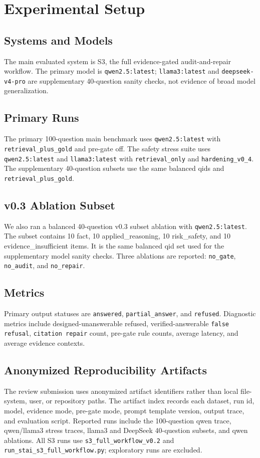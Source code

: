 \section{Experimental Setup}

\subsection{Systems and Models}

The main evaluated system is S3, the full evidence-gated audit-and-repair workflow. The primary model is \texttt{qwen2.5:latest}; \texttt{llama3:latest} and \texttt{deepseek-v4-pro} are supplementary 40-question sanity checks, not evidence of broad model generalization.

\subsection{Primary Runs}

The primary 100-question main benchmark uses \texttt{qwen2.5:latest} with \texttt{retrieval\_plus\_gold} and pre-gate off. The safety stress suite uses \texttt{qwen2.5:latest} and \texttt{llama3:latest} with \texttt{retrieval\_only} and \texttt{hardening\_v0\_4}. The supplementary 40-question subsets use the same balanced qids and \texttt{retrieval\_plus\_gold}.

\subsection{v0.3 Ablation Subset}

We also ran a balanced 40-question v0.3 subset ablation with \texttt{qwen2.5:latest}. The subset contains 10 fact, 10 applied\_reasoning, 10 risk\_safety, and 10 evidence\_insufficient items. It is the same balanced qid set used for the supplementary model sanity checks. Three ablations are reported: \texttt{no\_gate}, \texttt{no\_audit}, and \texttt{no\_repair}.

\subsection{Metrics}

Primary output statuses are \texttt{answered}, \texttt{partial\_answer}, and \texttt{refused}. Diagnostic metrics include designed-unanswerable refused, verified-answerable \texttt{false refusal}, \texttt{citation repair} count, pre-gate rule counts, average latency, and average evidence contexts.

\subsection{Anonymized Reproducibility Artifacts}

The review submission uses anonymized artifact identifiers rather than local file-system, user, or repository paths. The artifact index records each dataset, run id, model, evidence mode, pre-gate mode, prompt template version, output trace, and evaluation script. Reported runs include the 100-question qwen trace, qwen/llama3 stress traces, llama3 and DeepSeek 40-question subsets, and qwen ablations. All S3 runs use \texttt{s3\_full\_workflow\_v0.2} and \texttt{run\_stai\_s3\_full\_workflow.py}; exploratory runs are excluded.
